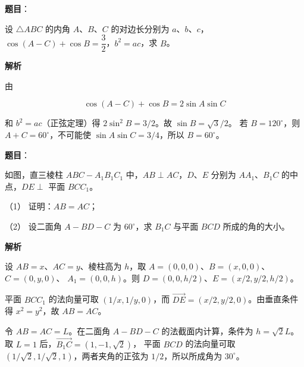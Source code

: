 \begin{answer}

\textbf{题目}：

设 $\triangle ABC$ 的内角 $A\text{、}B\text{、}C$ 的对边长分别为 $a\text{、}b\text{、}c$，$\cos(A-C)+\cos B=\dfrac32$，$b^2=ac$，求 $B$。

\textbf{解析}

由

\nopagebreak[4]
\[
\cos(A-C)+\cos B=2\sin A\sin C
\]

和 $b^2=ac$（正弦定理）得
$2\sin^2B=3/2$。故 $\sin B=\sqrt3/2$。
若 $B=120^\circ$，则 $A+C=60^\circ$，不可能使
$\sin A\sin C=3/4$，所以 $B=60^\circ$。


\end{answer}
\begin{answer}

\textbf{题目}：

如图，直三棱柱 $ABC-A_1B_1C_1$ 中，$AB\perp AC$，$D\text{、}E$ 分别为 $AA_1\text{、}B_1C$ 的中点，$DE\perp$ 平面 $BCC_1$。
\nopagebreak[4]
\begin{center}\end{center}
\nopagebreak[4]
（1） 证明：$AB=AC$；

（2） 设二面角 $A-BD-C$ 为 $60^\circ$，求 $B_1C$ 与平面 $BCD$ 所成的角的大小。

\textbf{解析}


设 $AB=x$、$AC=y$、棱柱高为 $h$，取
$A=(0,0,0)$、$B=(x,0,0)$、$C=(0,y,0)$、
$A_1=(0,0,h)$。则
$D=(0,0,h/2)$、$E=(x/2,y/2,h/2)$。

平面 $BCC_1$ 的法向量可取 $(1/x,1/y,0)$，而
$\overrightarrow{DE}=(x/2,y/2,0)$。由垂直条件得
$x^2=y^2$，故 $AB=AC$。


令 $AB=AC=L$。在二面角 $A-BD-C$ 的法截面内计算，条件为
$h=\sqrt2L$。取 $L=1$ 后，$\overrightarrow{B_1C}=(1,-1,\sqrt2)$，
平面 $BCD$ 的法向量可取 $(1/\sqrt2,1/\sqrt2,1)$，两者夹角的正弦为
$1/2$，所以所成角为 $30^\circ$。



\end{answer}
